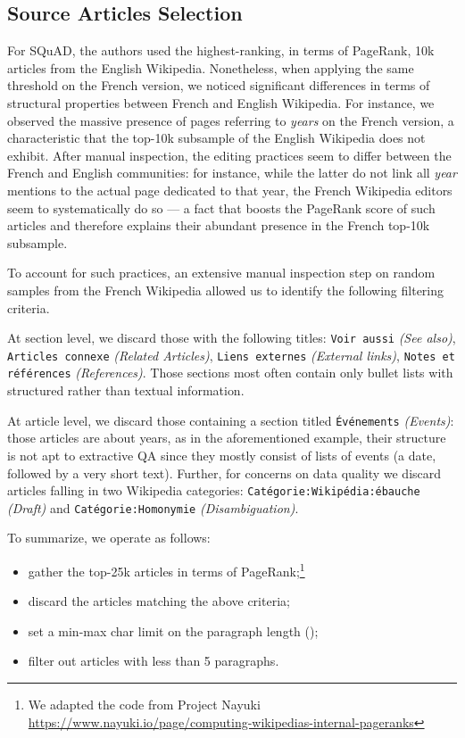 \documentclass[10pt, a4paper]{article}
\begin{document}
\subsection*{Source Articles Selection}
For SQuAD, the authors used the highest-ranking, in terms of PageRank, 10k articles from the English Wikipedia. Nonetheless, when applying the same threshold on the French version, we noticed significant differences in terms of structural properties between French and English Wikipedia. For instance, we observed the massive presence of pages referring to \emph{years} on the French version, a characteristic that the top-10k subsample of the English Wikipedia does not exhibit. After manual inspection, the editing practices seem to differ between the French and English communities: for instance, while the latter do not link all \emph{year} mentions to the actual page dedicated to that year, the French Wikipedia editors seem to systematically do so --- a fact that boosts the PageRank score of such articles and therefore explains their abundant presence in the French top-10k subsample.

To account for such practices, an extensive manual inspection step on random samples from the French Wikipedia allowed us to identify the following filtering criteria. 

At section level, we discard those with the following titles: \texttt{Voir aussi} \emph{(See also)}, \texttt{Articles connexe} \emph{(Related Articles)}, \texttt{Liens externes} \emph{(External links)}, \texttt{Notes et références} \emph{(References)}. Those sections most often contain only bullet lists with structured rather than textual information.

At article level, we discard those containing a section titled \texttt{Événements} \emph{(Events)}: those articles are about years, as in the aforementioned example, their structure is not apt to extractive QA since they mostly consist of lists of events (a date, followed by a very short text). Further, for concerns on data quality we discard articles falling in two Wikipedia categories: \texttt{Catégorie:Wikipédia:ébauche} \emph{(Draft)} and  \texttt{Catégorie:Homonymie} \emph{(Disambiguation)}.


To summarize, we operate as follows:
\begin{itemize}
    \item gather the top-25k articles in terms of PageRank;\footnote{We adapted the code from Project Nayuki \url{https://www.nayuki.io/page/computing-wikipedias-internal-pageranks}}
    \item discard the articles matching the above criteria;
    \item set a min-max char limit on the paragraph length ();
    \item filter out articles with less than 5 paragraphs.
\end{itemize}
\end{document}
